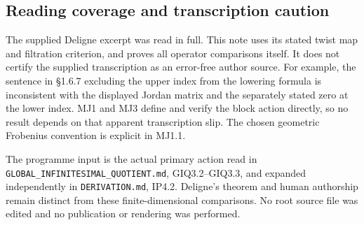 \subsection{Reading coverage and transcription
caution}\label{reading-coverage-and-transcription-caution}

The supplied Deligne excerpt was read in full. This note uses its stated
twist map and filtration criterion, and proves all operator comparisons
itself. It does not certify the supplied transcription as an error-free
author source. For example, the sentence in §1.6.7 excluding the upper
index from the lowering formula is inconsistent with the displayed
Jordan matrix and the separately stated zero at the lower index. MJ1 and
MJ3 define and verify the block action directly, so no result depends on
that apparent transcription slip. The chosen geometric Frobenius
convention is explicit in MJ1.1.

The programme input is the actual primary action read in
\nolinkurl{GLOBAL_INFINITESIMAL_QUOTIENT.md}, GIQ3.2--GIQ3.3, and
expanded independently in \nolinkurl{DERIVATION.md}, IP4.2. Deligne's
theorem and human authorship remain distinct from these
finite-dimensional comparisons. No root source file was edited and no
publication or rendering was performed.
